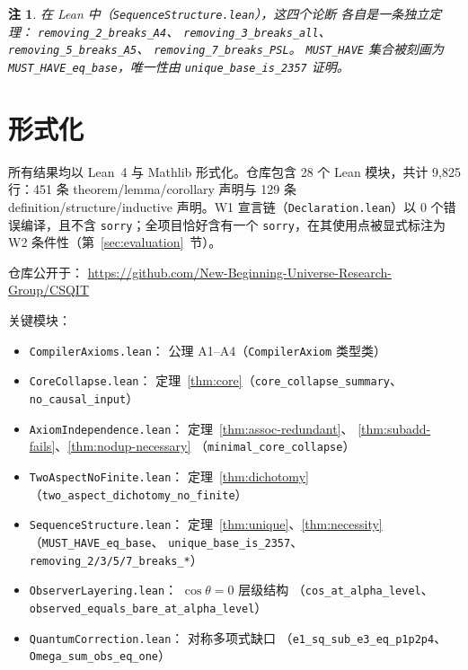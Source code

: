 \documentclass[11pt]{ctexart}
\newtheorem{remark}[theorem]{注}
\begin{document}
\begin{remark}
在 Lean 中（\texttt{SequenceStructure.lean}），这四个论断
各自是一条独立定理：
\texttt{removing\_2\_breaks\_A4}、
\texttt{removing\_3\_breaks\_all}、
\texttt{removing\_5\_breaks\_A5}、
\texttt{removing\_7\_breaks\_PSL}。
\texttt{MUST\_HAVE} 集合被刻画为
\texttt{MUST\_HAVE\_eq\_base}，唯一性由
\texttt{unique\_base\_is\_2357} 证明。
\end{remark}

\section{形式化}
\label{sec:formalization}

所有结果均以 Lean~4 与 Mathlib 形式化。仓库包含 28 个 Lean 模块，共计 9,825 行：451 条 theorem/lemma/corollary 声明与 129 条 definition/structure/inductive 声明。W1 宣言链（\texttt{Declaration.lean}）以 0 个错误编译，且不含 \texttt{sorry}；全项目恰好含有一个 \texttt{sorry}，在其使用点被显式标注为 W2 条件性（第~\ref{sec:evaluation}~节）。

仓库公开于：
\url{https://github.com/New-Beginning-Universe-Research-Group/CSQIT}

关键模块：
\begin{itemize}
\item \texttt{CompilerAxioms.lean}：
  公理 A1--A4（\texttt{CompilerAxiom} 类型类）
\item \texttt{CoreCollapse.lean}：
  定理~\ref{thm:core}（\texttt{core\_collapse\_summary}、
  \texttt{no\_causal\_input}）
\item \texttt{AxiomIndependence.lean}：
  定理~\ref{thm:assoc-redundant}、
  \ref{thm:subadd-fails}、\ref{thm:nodup-necessary}
  （\texttt{minimal\_core\_collapse}）
\item \texttt{TwoAspectNoFinite.lean}：
  定理~\ref{thm:dichotomy}
  （\texttt{two\_aspect\_dichotomy\_no\_finite}）
\item \texttt{SequenceStructure.lean}：
  定理~\ref{thm:unique}、\ref{thm:necessity}
  （\texttt{MUST\_HAVE\_eq\_base}、
  \texttt{unique\_base\_is\_2357}、
  \texttt{removing\_2/3/5/7\_breaks\_*}）
\item \texttt{ObserverLayering.lean}：
  $\cos\theta = 0$ 层级结构
  （\texttt{cos\_at\_alpha\_level}、
  \texttt{observed\_equals\_bare\_at\_alpha\_level}）
\item \texttt{QuantumCorrection.lean}：
  对称多项式缺口
  （\texttt{e1\_sq\_sub\_e3\_eq\_p1p2p4}、
  \texttt{Omega\_sum\_obs\_eq\_one}）
\end{itemize}
\end{document}
